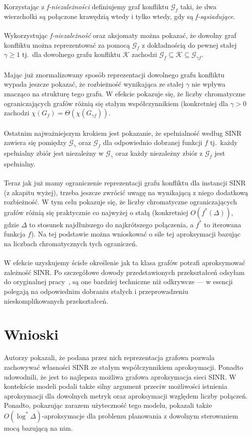 \documentclass[11pt,a4paper,onecolumn,twoside]{mwart}
\begin{document}
Korzystając z \textit{f-niezależności} definiujemy graf konfliktu
$\mathcal{G}_f$ taki, że dwa wierzchołki są połączone krawędzią wtedy i tylko
wtedy, gdy są \textit{f-sąsiadujące}. \\
\\
Wykorzystując \textit{f-niezależność} oraz aksjomaty można pokazać,
że dowolny graf konfliktu można reprezentować za pomocą $\mathcal{G}_f$
z dokładnością do pewnej stałej $\gamma \geq 1$ tj.\ dla dowolnego grafu
konfliktu $\mathcal{K}$ zachodzi $\mathcal{G}_f \subseteq \mathcal{K} \subseteq
\mathcal{G}_{\gamma f}$.
\\\\
Mając już znormalizowany sposób reprezentacji dowolnego grafu konfliktu wypada
jeszcze pokazać, że rozbieżność wynikająca ze stałej $\gamma$ nie wpływa
znacząco na strukturę tego grafu. W efekcie pokazuje się, że liczby chromatyczne
ograniczających grafów różnią się stałym współczynnikiem (konkretniej dla
$\gamma > 0$ zachodzi $\chi\left(G_{f}\right) =
\Theta\left(\chi\left(G_{\gamma f}\right)\right)$. \\
\\
Ostatnim najważniejszym krokiem jest pokazanie, że spełnialność według SINR
zawiera się pomiędzy $\mathcal{G}_{\gamma}$ oraz $\mathcal{G}_f$ dla odpowiednio
dobranej funkcji $f$ tj.\ każdy spełnialny zbiór jest niezależny w
$\mathcal{G}_{\gamma}$ oraz każdy niezależny zbiór z $\mathcal{G}_f$ jest
spełnialny. \\
\\
Teraz jak już mamy ograniczenie reprezentacji grafu konfliktu dla instancji SINR
(z akapitu wyżej), trzeba jeszcze zwrócić uwagę na wynikającą z niego dodatkową
rozbieżność. W tym celu pokazuje się, że liczby chromatyczne ograniczających
grafów różnią się praktycznie co najwyżej o stałą (konkretniej
$O(f^{*}(\Delta))$, gdzie $\Delta$ to stosunek najdłuższego do najkrótszego
połączenia, a $f^{*}$ to iterowana funkcja $f$).
Na tej podstawie można wnioskować o sile tej aproksymacji bazując na liczbach
chromatycznych tych ograniczeń.
\\\\
W efekcie uzyskujemy ścisłe określenie jak ta klasa grafów potrafi aproksymować
zależność SINR\@. Po szczegółowe dowody przedstawionych przekształceń odsyłam do
oryginalnej pracy~\cite{Halldorsson:2015:WGR:2746539.2746585}, są one bardziej
techniczne niż odkrywcze --- w esencji polegają na odpowiednim dobraniu stałych
i przeprowadzeniu nieskomplikowanych przekształceń.

\section{Wnioski}
Autorzy pokazali, że podana przez nich reprezentacja grafowa pozwala zachowywać
własności SINR ze stałym współczynnikiem aproksymacji. Ponadto udowodnili, że
jest to najlepsza możliwa grafowa aproksymacja sieci SINR\@. W kontekście modeli
podali także silny argument przeciw możliwości istnienia aproksymacji dla
dowolnych metryk oraz aproksymacji względem liczby połączeń. Ponadto, pokazując
zarazem użyteczność tego modelu, pokazali także $O(\log^*\Delta)$-aproksymacje
dla problemu planowania z dowolnym sterowaniem mocą bazującą na nim.
\end{document}
